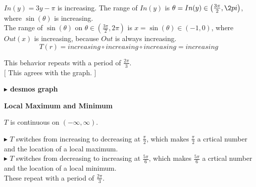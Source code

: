 \documentclass{ximera}
\begin{document}
$In(y) = 3y - \pi$ is increasing.  The range of $In(y)$ is $\theta = In(y) \in \left( \frac{3\pi}{2}, \2pi \right)$, where $\sin(\theta)$ is increasing. \\



The range of $\sin(\theta)$ on $\theta \in \left( \frac{3\pi}{2}, 2\pi \right)$ is $x = \sin(\theta) \in (-1, 0)$, where $Out(x)$ is increasing, because $Out$ is always increasing. \\


\[
T(r) = increasing \circ increasing \circ increasing = increasing
\]







This behavior repeats with a period of $\frac{2\pi}{3}$. \\



[ This agrees with the graph. ]





\textbf{\textcolor{blue!55!black}{$\blacktriangleright$ desmos graph}} 
\begin{center}
\end{center}



















\textbf{\textcolor{blue!55!black}{Local Maximum and Minimum}}



$T$ is continuous on $(-\infty, \infty)$.


$\blacktriangleright$ $T$ switches from increasing to decreasing at $\frac{\pi}{2}$, which makes $\frac{\pi}{2}$ a crtical number and the location of a local maximum. \\




$\blacktriangleright$ $T$ switches from decreasing to increasing at $\frac{5\pi}{6}$, which makes $\frac{5\pi}{6}$ a crtical number and the location of a local minimum. \\


These repeat with a period of $\frac{2\pi}{3}$. \\
\end{document}
